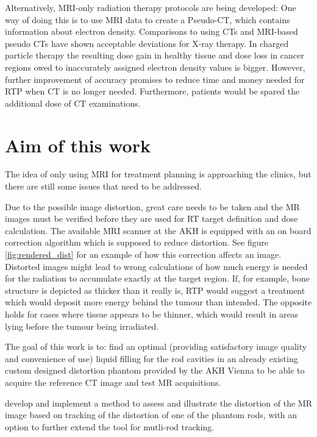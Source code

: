 Alternatively, MRI-only radiation therapy protocols are being developed:
One way of doing this is to use MRI data to create a Pseudo-CT, which contains information about electron density.
Comparisons to using CTs and MRI-based pseudo CTs have shown acceptable deviations for X-ray therapy.
In charged particle therapy the resulting dose gain in healthy tissue and dose loss in cancer regions owed to inaccurately assigned electron density values is bigger.
However, further improvement of accuracy promises to reduce time and money needed for RTP when CT is no longer needed.
Furthermore, patients would be spared the additional dose of CT examinations.  \cite{Rank2013, Stanescu2006, Nyholm2015, Greer2015, Chen2004}


\section{Aim of this work}
The idea of only using MRI for treatment planning is approaching the clinics, but there are still some issues that need to be addressed.

Due to the possible image distortion, great care needs to be taken and the MR images must be verified before they are used for RT target definition and dose calculation.
The available MRI scanner at the AKH is equipped with an on board correction algorithm which is supposed to reduce distortion.
See figure \ref{fig:rendered_dist} for an example of how this correction affects an image.
Distorted images might lead to wrong calculations of how much energy is needed for the radiation to accumulate exactly at the target region.
If, for example, bone structure is depicted as thicker than it really is, RTP would suggest a treatment which would deposit more energy behind the tumour than intended.
The opposite holds for cases where tissue appears to be thinner, which would result in areas lying before the tumour being irradiated.

The goal of this work is to:
find an optimal (providing satisfactory image quality and convenience of use) liquid filling for the rod cavities in an already existing custom designed distortion phantom provided by the AKH Vienna to be able to acquire the reference CT image and test MR acquisitions.

develop and implement a method to assess and illustrate the distortion of the MR image based on tracking of the distortion of one of the phantom rods, with an option to further extend the tool for mutli-rod tracking.


